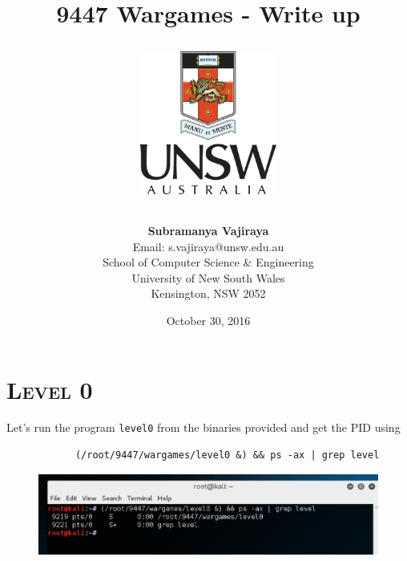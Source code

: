 \documentclass[12pt, bibliography=totocnumbered]{article}
\newcommand{\ssection}[1]{%
  \section[#1]{\centering\normalfont\scshape #1}}
\begin{document}
\title{9447 Wargames - Write up\vspace{0.9in}
\begin{figure}[H]
\centerline{\includegraphics[width=0.4\textwidth]{unswlogo.png}}
\end{figure}
\vspace{1.7in}}

\author{\textbf{Subramanya Vajiraya}\\Email: s.vajiraya@unsw.edu.au\\School of Computer Science \& Engineering\\University of New South Wales\\Kensington, NSW 2052}
\date{October 30, 2016}

\centering\maketitle
\thispagestyle{empty}
\newpage
\thispagestyle{empty}
\phantom{a}
\vfill
{}
\vfill
\newpage
\thispagestyle{empty}
\phantom{a}
\vfill
{}
\vfill
\newpage
{}
\tableofcontents
\newpage
{}
\setcounter{page}{1}
\justify
\doublespacing
\ssection{\textbf{Level 0}}

Let's run the program \texttt{level0} from the binaries provided and get the PID using 

\begin{varwidth}{\linewidth}
\begin{verbatim}
     		(/root/9447/wargames/level0 &) && ps -ax | grep level
\end{verbatim}
\end{varwidth}

\begin{figure}[H]
\centerline{\includegraphics[width=1\textwidth]{img/0/1.png}}
\end{figure}
\end{document}
